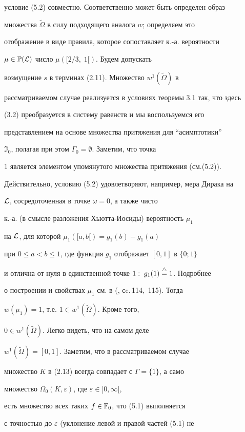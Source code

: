 условие (5.2) совместно. Соответственно может быть определен образ


множества $\tilde \Omega$ в силу подходящего аналога $w$; определяем это


отображение в виде правила, которое сопоставляет к.-а. вероятности


$\mu \in {\Bbb P}({\cal L})$ число ${\mu}([2/3,\;1[)$. Будем допускать


возмущение $s$ в терминах (2.11). Множество ${w^1}(\tilde \Omega)$ в


рассматриваемом случае реализуется в условиях теоремы 3.1 так, что здесь


(3.2) преобразуется в систему равенств и мы воспользуемся его


представлением на основе множества притяжения для ``асимптотики''


$\Im_0$, полагая при этом $\Gamma_0 = \emptyset$. Заметим, что точка


$1$ является элементом упомянутого множества притяжения (см.(5.2)).


Действительно, условию (5.2) удовлетворяют, например, мера Дирака на


${\cal L}$, сосредоточенная в точке $\omega = 0$, а также чисто


к.-а. (в смысле разложения Хьютта-Иосиды) вероятность ${\mu}_1$


на ${\cal L}$, для которой ${{\mu}_1}([a,b[) = {g_1}(b) - {g_1}(a)$


при $0 \le a < b \le 1$, где функция $g_1$ отображает $[0,1]$ в $\{0;1\}$


и отлична от нуля в единственной точке $1:\;{g_1}(1)\overset{\triangle}{=}{1}$. Подробнее


о построении и свойствах ${\mu}_1$ см. в (\cite{Ch8}, сc.\,114,~115). Тогда


$w({\mu}_1) = 1$, т.е. $1 \in {w^1}(\tilde \Omega)$. Кроме того,


$0 \in {w^1}(\tilde \Omega)$. Легко видеть, что на самом деле


${w^1}(\tilde \Omega) = [0,1]$. Заметим, что в рассматриваемом случае


множество $K$ в (2.13) всегда совпадает с $\Gamma = \{1\}$, а само


множество ${{\Omega}_0}(K,\varepsilon)$, где $\varepsilon \in ]0,\infty[$,


есть множество всех таких $f \in {{\Bbb F}_0}$, что (5.1) выполняется


с точностью до $\varepsilon$ (уклонение левой и правой частей (5.1) не



